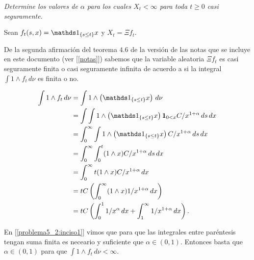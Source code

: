 \emph{
	Determine los valores  de $\alpha$ para los cuales $X_t < \infty$ para toda $t \geq 0$ casi seguramente.
}

\afterstatement\pn

Sean $f_t(s,x) = \indic_{\{ s \leq t\}} x$ y $X_t = \Xi f_t$.\pn

De la segunda afirmación del teorema $4.6$ de la versión de las notas que se incluye en este documento 
(ver [\ref{notas}]) sabemos que la variable aleatoria $\Xi f_t$ es casi seguramente finita o casi seguramente infinita de
acuerdo a si la integral $\int 1 \wedge f_t \,d\nu$ es finita o no.\pn

\begin{align}
    \int 1 \wedge f_t \,d\nu    &=   \int 1 \wedge \left( \indic_{\{ s \leq t\}} x \right) \,d\nu                                   \\
                                &=   \int \int 1 \wedge \left( \indic_{\{ s \leq t\}} x \right) \indi{0<x} C/x^{1+\alpha} \,ds\,dx  \\
                                &=   \int_0^\infty \int 1 \wedge \left( \indic_{\{ s \leq t\}} x \right) C/x^{1+\alpha} \,ds\,dx    \\
                                &=   \int_0^\infty \int_0^t (1 \wedge x) C/x^{1+\alpha} \,ds\,dx                                    \\
                                &=   \int_0^\infty t (1 \wedge x) C/x^{1+\alpha} \,dx                                               \\
                                &=   tC \left(\int_0^\infty  (1 \wedge x) 1/x^{1+\alpha} \,dx\right)                                \\
                                &=   tC \left(\int_0^1  1/x^{\alpha} \,dx + \int_1^\infty 1/x^{1+\alpha} \,dx\right).
\end{align}

En [\ref{problema5_2:inciso1}] vimos que para que las integrales entre paréntesis tengan suma finita es neceario y suficiente que $\alpha \in (0, 1)$. 
Entonces basta que $\alpha \in (0, 1)$ para que $\int 1 \wedge f_t \,d\nu < \infty$.